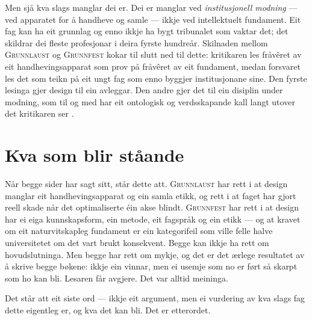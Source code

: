 Men sjå kva slags manglar dei er. Dei er manglar ved \emph{institusjonell modning} — ved apparatet for å handheve og samle — ikkje ved intellektuelt fundament. Eit fag kan ha eit grunnlag og enno ikkje ha bygt tribunalet som vaktar det; det skildrar dei fleste profesjonar i deira fyrste hundreår. Skilnaden mellom \textsc{Grunnlaust} og \textsc{Grunnfest} kokar til slutt ned til dette: kritikaren les fråvêret av eit handhevingsapparat som prov på fråvêret av eit fundament, medan forsvaret les det som teikn på eit ungt fag som enno byggjer institusjonane sine. Den fyrste lesinga gjer design til ein avleggar. Den andre gjer det til ein disiplin under modning, som til og med har eit ontologisk og verdsskapande kall langt utover det kritikaren ser \autocite{escobar2018pluriverse}.

\section{Kva som blir ståande}

Når begge sider har sagt sitt, står dette att. \textsc{Grunnlaust} har rett i at design manglar eit handhevingsapparat og ein samla etikk, og rett i at faget har gjort reell skade når det optimaliserte éin akse blindt. \textsc{Grunnfest} har rett i at design har ei eiga kunnskapsform, ein metode, eit fagspråk og ein etikk — og at kravet om eit naturvitskapleg fundament er ein kategorifeil som ville felle halve universitetet om det vart brukt konsekvent. Begge kan ikkje ha rett om hovudslutninga. Men begge har rett om mykje, og det er det ærlege resultatet av å skrive begge bøkene: ikkje ein vinnar, men ei usemje som no er ført så skarpt som ho kan bli. Lesaren får avgjere. Det var alltid meininga.

\vignett

Det står att eit siste ord — ikkje eit argument, men ei vurdering av kva slags fag dette eigentleg er, og kva det kan bli. Det er etterordet.

